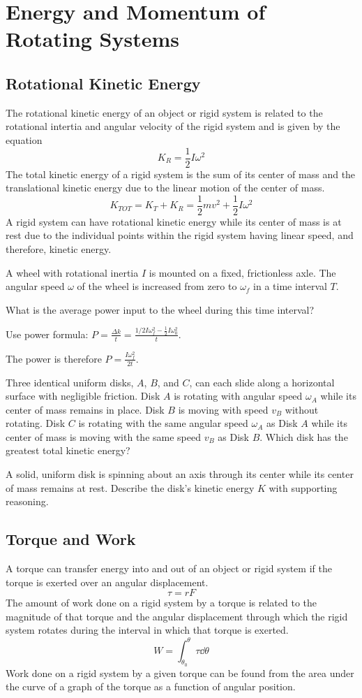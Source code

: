 \documentclass[../mech.tex]{subfiles}
\begin{document}
\chapter{Energy and Momentum of Rotating Systems}
\section{Rotational Kinetic Energy}
The rotational kinetic energy of an object or rigid system is related to the rotational intertia and angular velocity of the rigid system and is given by the equation 
\[ K_R = \frac{1}{2}I\omega^2 \]
The total kinetic energy of a rigid system is the sum of its center of mass and the translational kinetic energy due to the linear motion of the center of mass.
\[ K_{TOT}=K_T+K_R = \frac{1}{2}mv^2+\frac{1}{2}I\omega^2 \]
A rigid system can have rotational kinetic energy while its center of mass is at rest due to the individual points within the rigid system having linear speed, and therefore, kinetic energy.

\begin{example}
    A wheel with rotational inertia $I$ is mounted on a fixed, frictionless axle. The angular speed $\omega$ of the wheel is increased from zero to $\omega_f$ in a time interval $T$.

    What is the average power input to the wheel during this time interval?

    Use power formula: $P=\frac{\Delta k}{t}=\frac{1/2 I\omega_f^2 - \frac{1}{2}I\omega_0^2}{t}$.

    The power is therefore $P=\frac{I\omega_f^2}{2t}$.
\end{example}

\ex Three identical uniform disks, $A$, $B$, and $C$, can each slide along a horizontal surface with negligible friction. Disk $A$ is rotating with angular speed $\omega_A$ while its center of mass remains in place.
Disk $B$ is moving with speed $v_B$ without rotating. Disk $C$ is rotating with the same angular speed $\omega_A$ as Disk $A$ while its center of mass is moving with the same speed $v_B$ as Disk $B$. Which disk has the greatest total kinetic energy?

\ex A solid, uniform disk is spinning about an axis through its center while its center of mass remains at rest. Describe the disk's kinetic energy $K$ with supporting reasoning.

\section{Torque and Work}
A torque can transfer energy into and out of an object or rigid system if the torque is exerted over an angular displacement.
\[ \tau = rF \]
The amount of work done on a rigid system by a torque is related to the magnitude of that torque and the angular displacement through which the rigid system rotates during the interval in which that torque is exerted.
\[ W = \int_{\theta_0}^{\theta} \tau \dd \theta \]
Work done on a rigid system by a given torque can be found from the area under the curve of a graph of the torque as a function of angular position.
\end{document}
